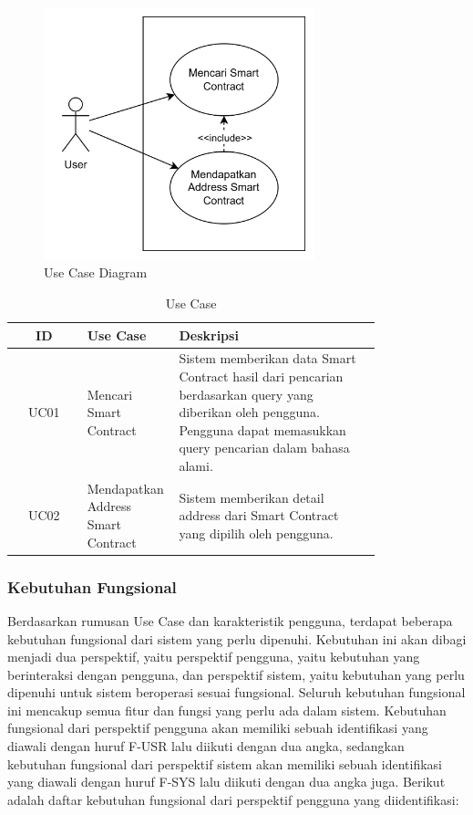 \begin{figure}[ht]
	\centering
	\includegraphics[width=0.7\textwidth]{resources/chapter-3/use-case.png}
	\caption{Use Case Diagram}
	\label{image:usecase}
\end{figure}

\begin{table}[h]
	\caption{Use Case}
	\label{tabel:use-case}
	\vspace{0.25cm}
	\begin{center}
		\begin{tabular}{|c|p{0.25\linewidth}|p{0.55\linewidth}|}
			\hline
			\textbf{ID} & \textbf{Use Case} & \textbf{Deskripsi} \\ \hline
			UC01 & Mencari Smart Contract & Sistem memberikan data Smart Contract hasil dari pencarian berdasarkan query yang diberikan oleh pengguna. Pengguna dapat memasukkan query pencarian dalam bahasa alami. \\ \hline
			UC02 & Mendapatkan Address Smart Contract & Sistem memberikan detail address dari Smart Contract yang dipilih oleh pengguna. \\ \hline
		\end{tabular}
	\end{center}
\end{table}

\subsubsection{Kebutuhan Fungsional}

Berdasarkan rumusan Use Case dan karakteristik pengguna, terdapat beberapa kebutuhan fungsional dari sistem yang perlu dipenuhi. Kebutuhan ini akan dibagi menjadi dua perspektif, yaitu perspektif pengguna, yaitu kebutuhan yang berinteraksi dengan pengguna, dan perspektif sistem, yaitu kebutuhan yang perlu dipenuhi untuk sistem beroperasi sesuai fungsional. Seluruh kebutuhan fungsional ini mencakup semua fitur dan fungsi yang perlu ada dalam sistem. Kebutuhan fungsional dari perspektif pengguna akan memiliki sebuah identifikasi yang diawali dengan huruf F-USR lalu diikuti dengan dua angka, sedangkan kebutuhan fungsional dari perspektif sistem akan memiliki sebuah identifikasi yang diawali dengan huruf F-SYS lalu diikuti dengan dua angka juga. Berikut adalah daftar kebutuhan fungsional dari perspektif pengguna yang diidentifikasi:

